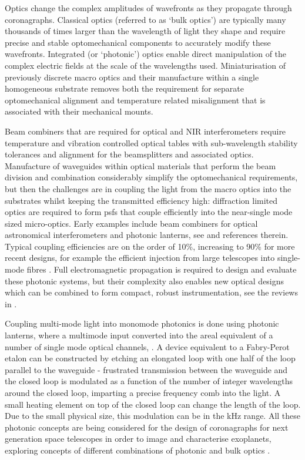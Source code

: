 \documentclass[letterpaper]{ar-1col}
\begin{document}
Optics change the complex amplitudes of wavefronts as they propagate through coronagraphs.
%
Classical optics (referred to as `bulk optics') are typically many thousands of times larger than the wavelength of light they shape and require precise and stable optomechanical components to accurately modify these wavefronts.
%
Integrated (or `photonic') optics enable direct manipulation of the complex electric fields at the scale of the wavelengths used.
%
Miniaturisation of previously discrete macro optics and their manufacture within a single homogeneous substrate removes both the requirement for separate optomechanical alignment and temperature related misalignment that is associated with their mechanical mounts.

Beam combiners that are required for optical and NIR interferometers require temperature and vibration controlled optical tables with sub-wavelength stability tolerances and alignment for the beamsplitters and associated optics.
%
Manufacture of waveguides within optical materials that perform the beam division and combination considerably simplify the optomechanical requirements, but then the challenges are in coupling the light from the macro optics into the substrates whilst keeping the transmitted efficiency high: diffraction limited optics are required to form \acp{psf} that couple efficiently into the near-single mode sized micro-optics.
%
Early examples include beam combiners for optical astronomical interferometers \citep[for example the IOTA/IONIC beam combiner; ][]{Berger01} and photonic lanterns, see \citet{Leon-Saval10} and references therein.
%
Typical coupling efficiencies are on the order of 10\%, increasing to 90\% for more recent designs, for example the efficient injection from large telescopes into single-mode fibres \citep{Jovanovic17}.
%
Full electromagnetic propagation is required to design and evaluate these photonic systems, but their complexity also enables new optical designs which can be combined to form compact, robust instrumentation, see the reviews in \citet{Minardi21,Jovanovic23}.

Coupling multi-mode light into monomode photonics is done using photonic lanterns, where a multimode input converted into the areal equivalent of a number of single mode optical channels, \citep{Norris22}.
%
A device equivalent to a Fabry-Perot etalon can be constructed by etching an elongated loop with one half of the loop parallel to the waveguide - frustrated transmission between the waveguide and the closed loop is modulated as a function of the number of integer wavelengths around the closed loop, imparting a precise frequency comb into the light.
%
A small heating element on top of the closed loop can change the length of the loop.
%
Due to the small physical size, this modulation can be in the kHz range.
%
All these photonic concepts are being considered for the design of coronagraphs for next generation space telescopes in order to image and characterise exoplanets, exploring concepts of different combinations of photonic and bulk optics \citep{Desai23a}.
\end{document}
